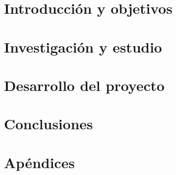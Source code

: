 
\cleardoubleevenemptypage
\part{Introducción y objetivos}
\label{part:introduccion-objetivos}








\cleardoubleevenemptypage
\part{Investigación y estudio}
\label{part:investigacion-estudio}



\cleardoubleevenemptypage
\part{Desarrollo del proyecto}
\label{part:desarrollo-proyecto}



\cleardoubleevenemptypage
\part{Conclusiones}
\label{part:conclusiones}



\cleardoubleevenemptypage
\part{Apéndices}
\label{part:apendices}
\appendix


